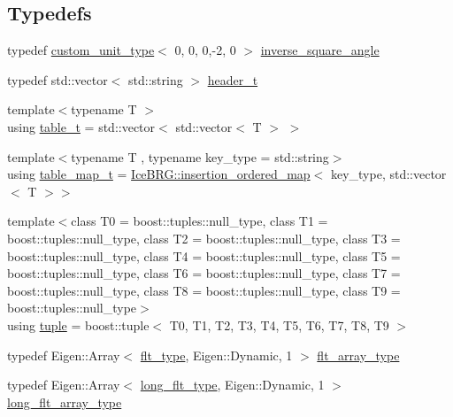 \subsection*{Typedefs}
\begin{DoxyCompactItemize}
\item 
typedef \hyperlink{namespaceIceBRG_a896bc1bf7e8db5ca045b9cf35912ca5e}{custom\+\_\+unit\+\_\+type}$<$ 0, 0, 0,-\/2, 0 $>$ \hyperlink{namespaceIceBRG_a26efaff9c9adf346c7d09d0b714731f6}{inverse\+\_\+square\+\_\+angle}
\item 
typedef std\+::vector$<$ std\+::string $>$ \hyperlink{namespaceIceBRG_a49e8b48f1dbd351e9748e7cbe80705df}{header\+\_\+t}
\item 
{\footnotesize template$<$typename T $>$ }\\using \hyperlink{namespaceIceBRG_a59734b1a7b525d7d926f69a91bc8553b}{table\+\_\+t} = std\+::vector$<$ std\+::vector$<$ T $>$ $>$
\item 
{\footnotesize template$<$typename T , typename key\+\_\+type  = std\+::string$>$ }\\using \hyperlink{namespaceIceBRG_a30d3b56b57feeb81f66815ff1bfaec6c}{table\+\_\+map\+\_\+t} = \hyperlink{classIceBRG_1_1insertion__ordered__map}{Ice\+B\+R\+G\+::insertion\+\_\+ordered\+\_\+map}$<$ key\+\_\+type, std\+::vector$<$ T $>$$>$
\item 
{\footnotesize template$<$class T0  = boost\+::tuples\+::null\+\_\+type, class T1  = boost\+::tuples\+::null\+\_\+type, class T2  = boost\+::tuples\+::null\+\_\+type, class T3  = boost\+::tuples\+::null\+\_\+type, class T4  = boost\+::tuples\+::null\+\_\+type, class T5  = boost\+::tuples\+::null\+\_\+type, class T6  = boost\+::tuples\+::null\+\_\+type, class T7  = boost\+::tuples\+::null\+\_\+type, class T8  = boost\+::tuples\+::null\+\_\+type, class T9  = boost\+::tuples\+::null\+\_\+type$>$ }\\using \hyperlink{namespaceIceBRG_a5148ef56bdd96f27ce60555b6aaa979e}{tuple} = boost\+::tuple$<$ T0, T1, T2, T3, T4, T5, T6, T7, T8, T9 $>$
\item 
typedef Eigen\+::\+Array$<$ \hyperlink{lib_2IceBRG__main_2common_8h_ad0f130a56eeb944d9ef2692ee881ecc4}{flt\+\_\+type}, Eigen\+::\+Dynamic, 1 $>$ \hyperlink{namespaceIceBRG_acdca5c05302480eba6ba053449643a6d}{flt\+\_\+array\+\_\+type}
\item 
typedef Eigen\+::\+Array$<$ \hyperlink{lib_2IceBRG__main_2common_8h_a7040956e7e1b504d34a9ccfb4253bdce}{long\+\_\+flt\+\_\+type}, Eigen\+::\+Dynamic, 1 $>$ \hyperlink{namespaceIceBRG_a92601c7ccb2563723f800de23ba666a6}{long\+\_\+flt\+\_\+array\+\_\+type}
$$
\end{DoxyCompactItemize}
